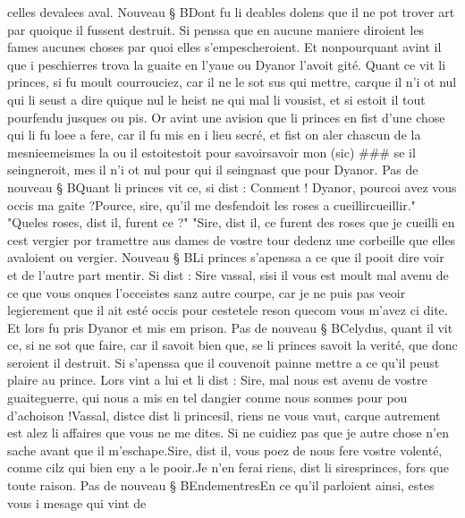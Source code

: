\documentclass{article}
\begin{document}
\begin{pages}
      celles devalees aval. 
   Nouveau § BDont fu li deables dolens que il ne pot trover art 
   par quoique il fussent destruit. Si penssa que 
   en aucune maniere diroient les fames aucunes choses par quoi elles s’empescheroient. 
   Et nonpourquant avint il que i peschierres trova la guaite en l’yaue ou 
   Dyanor l’avoit gité. Quant ce vit li princes, 
   si fu moult courrouciez, car il ne le sot sus qui mettre, carque il 
   n’i ot nul qui li seust a dire 
   quique nul le heist 
   ne qui mal li vousist, 
   et si estoit il tout pourfendu jusques ou pis. Or avint une 
   avision que li princes en fist 
   d’une chose 
   qui li fu loee a fere, car il fu mis en i lieu secré, et fist on aler chascun de la 
   mesnieemeismes 
   la ou il estoitestoit pour  
   savoirsavoir mon (sic) 
   ### 
   se il seingneroit, mes il n’i ot nul pour qui il 
   seingnast que pour Dyanor. \pend
\pstart Pas de nouveau § BQuant li princes 
   vit ce, si dist :
   Conment ! Dyanor, 
      pourcoi avez vous occis ma gaite ?Pource, sire, qu’il me desfendoit les roses a 
      cueillircueillir." "Queles roses, dist il, furent ce ?" 
         "Sire, dist il, ce furent des roses que je cueilli en cest
      vergier por tramettre aus dames de vostre tour dedenz une corbeille 
      que elles avaloient ou vergier.
   Nouveau § BLi princes s’apenssa a ce que il pooit dire voir 
   et de l’autre part mentir. Si dist :
   Sire vassal, 
      sisi il vous est moult mal avenu de 
      ce que vous onques l’occeistes sanz autre courpe, car je ne puis pas veoir legierement que il ait esté occis pour 
      cestetele reson 
      quecom vous m’avez ci dite.
   Et lors fu pris Dyanor et mis em prison. \pend
\pstart Pas de nouveau § BCelydus, 
   quant il vit ce, si ne sot que faire, car il savoit bien que, se 
   li princes savoit la verité, que donc seroient il destruit. 
   Si s’apenssa que il couvenoit painne mettre a ce qu’il peust plaire au 
      prince. Lors vint a lui et li dist :
   Sire, mal nous est avenu de vostre 
      guaiteguerre, 
   qui nous a mis en tel dangier conme nous sonmes pour pou d’achoison !Vassal, distce dist 
      li princesil, 
      riens ne vous vaut, 
      carque autrement est alez li affaires que vous ne me dites. 
      Si ne cuidiez pas que je autre chose n’en sache avant que il m’eschape.Sire, dist il, vous poez de nous fere vostre volenté, conme cilz qui bien 
      eny a le pooir.Je n’en ferai riens, dist 
      li siresprinces, 
      fors que toute raison. \pend
\pstart Pas de nouveau § BEndementresEn ce qu’il parloient ainsi, estes vous i mesage qui vint de 

\end{pages}
\end{document}
